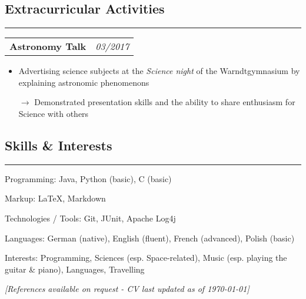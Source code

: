 \documentclass[10pt,letterpaper]{article}
\makeatletter
\newcommand{\headerrow}[2]
{\begin{tabular*}{\linewidth}{l@{\extracolsep{\fill}}r}
	#1 &
	#2 \\
\end{tabular*}}
\makeatother
\begin{document}

\subsection*{Extracurricular Activities}
\hrule
\vspace{0.4em}

\noindent
\headerrow{\textbf{Astronomy Talk}}{\emph{03/2017}}
\vspace{-1.6em}
\begin{itemize}
    \setlength\itemsep{0em}
    \item Advertising science subjects at the \emph{Science night} of the Warndtgymnasium by explaining astronomic phenomenons
    \item[$\rightarrow$] Demonstrated presentation skills and the ability to share enthusiasm for Science with others
\end{itemize}



\subsection*{Skills \& Interests}
\hrule
\vspace{0.4em}
\begin{description*}
	\item[Programming:]
	Java, Python (basic), C (basic)
    	\item[Markup:]
    	\LaTeX, Markdown
	\item[Technologies / Tools:]
	Git, JUnit, Apache Log4j
	\item[Languages:]
	German (native), English (fluent), French (advanced), Polish (basic)
   	\item[Interests:]
	Programming, Sciences (esp. Space-related), Music (esp. playing the guitar \& piano), Languages, Travelling
\end{description*}



\hfill \small \textit{[References available on request - CV last updated as of {\today}]}
\end{document}

